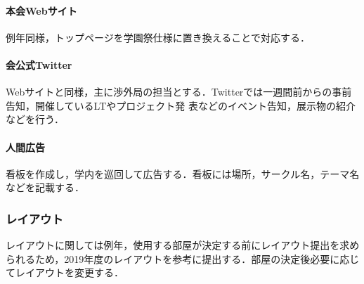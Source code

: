 \paragraph{本会Webサイト}
例年同様，トップページを学園祭仕様に置き換えることで対応する．
\paragraph{会公式Twitter}
Webサイトと同様，主に渉外局の担当とする．Twitterでは一週間前からの事前告知，開催しているLTやプロジェクト発
表などのイベント告知，展示物の紹介などを行う．
\paragraph{人間広告}
看板を作成し，学内を巡回して広告する．看板には場所，サークル名，テーマ名などを記載する．
\subsubsection*{レイアウト}
レイアウトに関しては例年，使用する部屋が決定する前にレイアウト提出を求められるため，2019年度のレイアウトを参考に提出する．部屋の決定後必要に応じてレイアウトを変更する．


